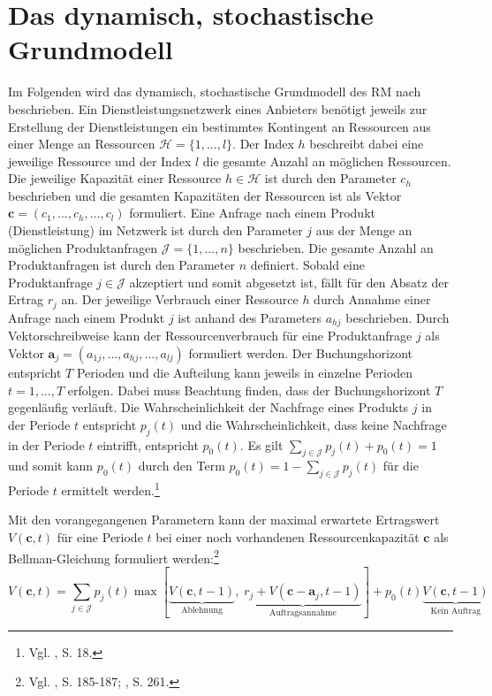 \section{Das dynamisch, stochastische Grundmodell}\label{Grundmodell}
Im Folgenden wird das dynamisch, stochastische Grundmodell des RM nach \cite{talluri2004revenue} beschrieben. Ein Dienstleistungsnetzwerk eines Anbieters benötigt jeweils zur Erstellung der Dienstleistungen ein bestimmtes Kontingent an Ressourcen aus einer Menge an Ressourcen $\mathcal{H} = \{1,...,l \}$. Der Index $h$ beschreibt dabei eine jeweilige Ressource und der Index $l$ die gesamte Anzahl an möglichen Ressourcen. Die jeweilige Kapazität einer Ressource $h \in \mathcal{H}$ ist durch den Parameter $c_{h}$ beschrieben und die gesamten Kapazitäten der Ressourcen ist als Vektor $\textbf{c}=(c_{1},...,c_{h},...,c_{l})$ formuliert. Eine Anfrage nach einem Produkt (Dienstleistung) im Netzwerk ist durch den Parameter $j$ aus der Menge an möglichen Produktanfragen $\mathcal{J} = \{1,...,n \}$ %
beschrieben. Die gesamte Anzahl an Produktanfragen ist durch den Parameter $n$ definiert. Sobald eine Produktanfrage $j\in \mathcal{J}$ akzeptiert und somit abgesetzt ist, fällt für den Absatz der Ertrag $r_{j}$ an. Der jeweilige Verbrauch einer Ressource $h$ durch Annahme einer Anfrage nach einem Produkt $j$ ist anhand des Parameters $a_{hj}$ beschrieben. Durch Vektorschreibweise kann der Ressourcenverbrauch für eine Produktanfrage $j$ als Vektor $\textbf{a}_{j}=(a_{1j},...,a_{hj},...,a_{lj})$ formuliert werden. Der Buchungshorizont entspricht $T$ Perioden und die Aufteilung kann jeweils in einzelne Perioden $t=1,...,T$ erfolgen. Dabei muss Beachtung finden, dass der Buchungshorizont $T$ gegenläufig verläuft. Die Wahrscheinlichkeit der Nachfrage eines Produkts $j$ in der Periode $t$ entspricht $p_{j}(t)$ und die Wahrscheinlichkeit, dass keine Nachfrage in der Periode $t$ eintrifft, entspricht $p_{0}(t)$. Es gilt $\sum_{j\in \mathcal{J}}p_{j}(t)+p_{0}(t)=1$ und somit kann $p_{0}(t)$ durch den Term $p_{0}(t)=1-\sum_{j\in \mathcal{J}}p_{j}(t)$ für die Periode $t$ ermittelt werden.\footnote{Vgl. \citeauthor{talluri2004revenue}, S. 18.} %


Mit den vorangegangenen Parametern kann der maximal erwartete Ertragswert $V(\textbf{c},t)$ für eine Periode $t$ bei einer noch vorhandenen Ressourcenkapazität $\textbf{c}$ als Bellman-Gleichung formuliert werden:\footnote{Vgl. \cite{Petrick:2009aa}, S. 185-187; \cite{doi:10.1287/trsc.37.3.257.16047}, S. 261.}
\begin{equation}\label{DP}
V(\textbf{c},t)=\sum_{j\in\mathcal{J}}p_{j}(t)\max[ \underbrace{V(\textbf{c},t-1)}_{\text{Ablehnung}},\; \underbrace{r_{j}+V(\textbf{c}-\textbf{a}_{j},t-1)}_{\text{Auftragsannahme}}]+p_{0}(t)\underbrace{V(\textbf{c},t-1)}_{\text{Kein Auftrag}}
\end{equation}


